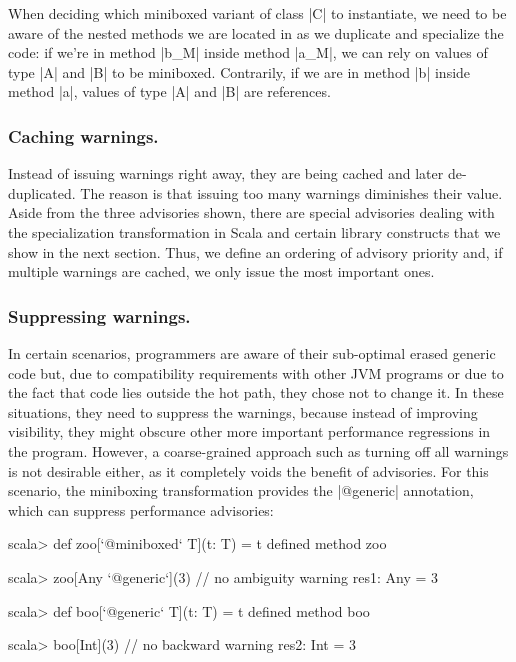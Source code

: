 When deciding which miniboxed variant of class |C| to instantiate, we need to be aware of the nested methods we are located in as we duplicate and specialize the code: if we're in method |b_M| inside method |a_M|, we can rely on values of type |A| and |B| to be miniboxed. Contrarily, if we are in method |b| inside method |a|, values of type |A| and |B| are references.



\subsubsection*{Caching warnings.} Instead of issuing warnings right away, they are being cached and later de-duplicated. The reason is that issuing too many warnings diminishes their value. Aside from the three advisories shown, there are special advisories dealing with the specialization transformation in Scala and certain library constructs that we show in the next section. Thus, we define an ordering of advisory priority and, if multiple warnings are cached, we only issue the most important ones.

\subsubsection*{Suppressing warnings.} In certain scenarios, programmers are aware of their sub-optimal erased generic code but, due to compatibility requirements with other JVM programs or due to the fact that code lies outside the hot path, they chose not to change it. In these situations, they need to suppress the warnings, because instead of improving visibility, they might obscure other more important performance regressions in the program. However, a coarse-grained approach such as turning off all warnings is not desirable either, as it completely voids the benefit of advisories. For this scenario, the miniboxing transformation provides the |@generic| annotation, which can suppress performance advisories:

\begin{lstlisting-nobreak}
 scala> def zoo[`@miniboxed` T](t: T) = t
 defined method zoo

 scala> zoo[Any `@generic`](3) // no ambiguity warning
 res1: Any = 3

 scala> def boo[`@generic` T](t: T) = t
 defined method boo

 scala> boo[Int](3)                   // no backward warning
 res2: Int = 3
\end{lstlisting-nobreak}



